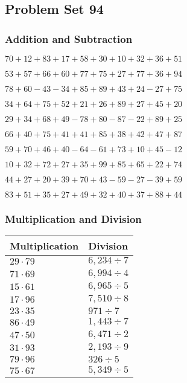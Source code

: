 \hypertarget{problem-set-94}{%
\subsection{Problem Set 94}\label{problem-set-94}}

\hypertarget{addition-and-subtraction}{%
\subsubsection{Addition and
Subtraction}\label{addition-and-subtraction}}

\(70+12+83+17+58+30+10+32+36+51\)

\(53+57+66+60+77+75+27+77+36+94\)

\(78+60-43-34+85+89+43+24-27+75\)

\(34+64+75+52+21+26+89+27+45+20\)

\(29+34+68+49-78+80-87-22+89+25\)

\(66+40+75+41+41+85+38+42+47+87\)

\(59+70+46+40-64-61+73+10+45-12\)

\(10+32+72+27+35+99+85+65+22+74\)

\(44+27+20+39+70+43-59-27-39+59\)

\(83+51+35+27+49+32+40+37+88+44\)

\hypertarget{multiplication-and-division}{%
\subsubsection{Multiplication and
Division}\label{multiplication-and-division}}

\begin{longtable}[]{@{}ll@{}}
\toprule
Multiplication & Division\tabularnewline
\midrule
\endhead
\(29\cdot79\) & \(6,234÷7\)\tabularnewline
\(71\cdot69\) & \(6,994÷4\)\tabularnewline
\(15\cdot61\) & \(6,965÷5\)\tabularnewline
\(17\cdot96\) & \(7,510÷8\)\tabularnewline
\(23\cdot35\) & \(971÷7\)\tabularnewline
\(86\cdot49\) & \(1,443÷7\)\tabularnewline
\(47\cdot50\) & \(6,471÷2\)\tabularnewline
\(31\cdot93\) & \(2,193÷9\)\tabularnewline
\(79\cdot96\) & \(326÷5\)\tabularnewline
\(75\cdot67\) & \(5,349÷5\)\tabularnewline
\bottomrule
\end{longtable}
